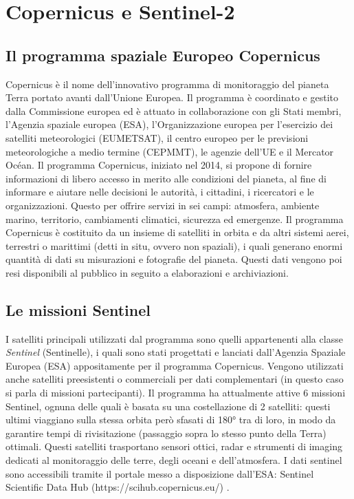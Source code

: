 \newpage
\section{Copernicus e Sentinel-2}
\subsection{Il programma spaziale Europeo Copernicus}
Copernicus \cite{COPERNICUS_INFO} è il nome dell’innovativo programma di 
monitoraggio del pianeta Terra portato avanti dall’Unione Europea.
Il programma è coordinato e gestito dalla Commissione europea ed è attuato in 
collaborazione con gli Stati membri, l'Agenzia spaziale europea (ESA), 
l'Organizzazione europea per l'esercizio dei satelliti meteorologici (EUMETSAT), 
il centro europeo per le previsioni meteorologiche a medio termine (CEPMMT), 
le agenzie dell'UE e il Mercator Océan.
Il programma Copernicus, iniziato nel 2014, si propone di fornire 
informazioni di libero accesso in merito alle condizioni del pianeta, 
al fine di informare e aiutare nelle decisioni le autorità, i cittadini, i 
ricercatori e le organizzazioni. Questo per offrire servizi in sei 
campi: atmosfera, ambiente marino, 
territorio, cambiamenti climatici, sicurezza ed emergenze. 
Il programma Copernicus è costituito da un insieme di satelliti in orbita 
e da altri sistemi aerei, terrestri o marittimi (detti in situ, ovvero non spaziali), 
i quali generano enormi quantità di dati su misurazioni e fotografie del pianeta.
Questi dati vengono poi resi disponibili al pubblico  
in seguito a elaborazioni e archiviazioni.

\subsection{Le missioni Sentinel}

I satelliti principali utilizzati dal programma sono quelli appartenenti 
alla classe \textit{Sentinel} (Sentinelle), i quali sono stati progettati e 
lanciati dall'Agenzia Spaziale Europea (ESA) appositamente per il programma 
Copernicus. Vengono utilizzati 
anche satelliti preesistenti o commerciali per dati complementari (in questo caso si parla 
di missioni partecipanti). Il programma ha attualmente attive 6 missioni Sentinel, ognuna delle 
quali è basata su una costellazione di 2 satelliti: questi ultimi viaggiano sulla stessa orbita 
però sfasati di 180° tra di loro, in modo da garantire tempi di rivisitazione 
(passaggio sopra lo stesso punto della Terra) ottimali. 
Questi satelliti trasportano sensori ottici, radar e strumenti di imaging 
dedicati al monitoraggio delle terre, degli oceani e dell’atmosfera.
I dati sentinel sono accessibili tramite il portale messo a disposizione dall'ESA: 
Sentinel Scientific Data Hub (https://scihub.copernicus.eu/) .

